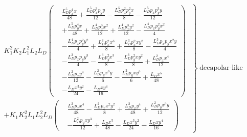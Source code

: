 \footnotesize
\begin{equation}
  \begin{aligned}
      &\left.
      \begin{aligned}
      &K_{1}^{2} K_{2} L_{1}^{2} L_{2} L_{D} \left(
     \begin{aligned}
       &\frac{L_{D}^{5} p_{x}^{4} x}{48} + \frac{L_{D}^{5} p_{x}^{3} p_{y} y}{12} - \frac{L_{D}^{5} p_{x}^{2} p_{y}^{2} x}{8} - \frac{L_{D}^{5} p_{x} p_{y}^{3} y}{12} \\
       &+ \frac{L_{D}^{5} p_{y}^{4} x}{48} + \frac{L_{D}^{4} p_{x}^{3} x^{2}}{12} + \frac{L_{D}^{4} p_{x}^{3} y^{2}}{12}- \frac{L_{D}^{4} p_{x} p_{y}^{2} x^{2}}{4} \\
       &- \frac{L_{D}^{4} p_{x} p_{y}^{2} y^{2}}{4} + \frac{L_{D}^{3} p_{x}^{2} x^{3}}{8} + \frac{L_{D}^{3} p_{x}^{2} x y^{2}}{8} - \frac{L_{D}^{3} p_{x} p_{y} x^{2} y}{4} \\
       &- \frac{L_{D}^{3} p_{x} p_{y} y^{3}}{4} - \frac{L_{D}^{3} p_{y}^{2} x^{3}}{8} - \frac{L_{D}^{3} p_{y}^{2} x y^{2}}{8} + \frac{L_{D}^{2} p_{x} x^{4}}{12} \\
       &- \frac{L_{D}^{2} p_{x} y^{4}}{12} - \frac{L_{D}^{2} p_{y} x^{3} y}{6} - \frac{L_{D}^{2} p_{y} x y^{3}}{6} + \frac{L_{D} x^{5}}{48} \\
       &- \frac{L_{D} x^{3} y^{2}}{24} - \frac{L_{D} x y^{4}}{16}
     \end{aligned} \right) \\
      &+ K_{1} K_{2}^{2} L_{1} L_{2}^{2} L_{D} \left(
      \begin{aligned}
        &\frac{L_{D}^{2} p_{x} x^{4}}{48} - \frac{L_{D}^{2} p_{x} x^{2} y^{2}}{8} + \frac{L_{D}^{2} p_{x} y^{4}}{48} + \frac{L_{D}^{2} p_{y} x^{3} y}{12} \\
        &- \frac{L_{D}^{2} p_{y} x y^{3}}{12} + \frac{L_{D} x^{5}}{48} - \frac{L_{D} x^{3} y^{2}}{24} - \frac{L_{D} x y^{4}}{16}
      \end{aligned}\right)
      \end{aligned}
      \; \right\} \; \text{decapolar-like} \\
  \end{aligned}
\end{equation}
\normalsize


\subsection{}
\label{appendix:transfer_map:sextupole_and_octupole}

